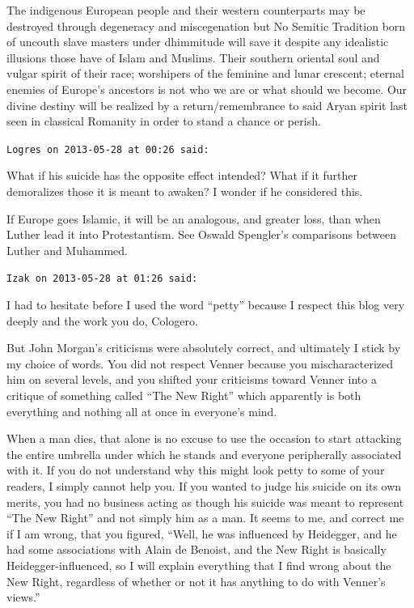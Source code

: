 \begin{footnotesize}
\begin{sffamily}
The indigenous European people and their western counterparts may be destroyed through degeneracy and miscegenation but No Semitic Tradition born of uncouth slave masters under dhimmitude will save it despite any idealistic illusions those have of Islam and Muslims. Their southern oriental soul and vulgar spirit of their race; worshipers of the feminine and lunar crescent; eternal enemies of Europe's ancestors is not who we are or what should we become. Our divine destiny will be realized by a return/remembrance to said Aryan spirit last seen in classical Romanity in order to stand a chance or perish.

\hfill

\texttt{Logres on 2013-05-28 at 00:26 said:}

What if his suicide has the opposite effect intended? What if it further demoralizes those it is meant to awaken? I wonder if he considered this.

If Europe goes Islamic, it will be an analogous, and greater loss, than when Luther lead it into Protestantism. See Oswald Spengler's comparisons between Luther and Muhammed.

\hfill

\texttt{Izak on 2013-05-28 at 01:26 said:}

I had to hesitate before I used the word ``petty'' because I respect this blog very deeply and the work you do, Cologero.

But John Morgan's criticisms were absolutely correct, and ultimately I stick by my choice of words. You did not respect Venner because you mischaracterized him on several levels, and you shifted your criticisms toward Venner into a critique of something called ``The New Right'' which apparently is both everything and nothing all at once in everyone's mind.

When a man dies, that alone is no excuse to use the occasion to start attacking the entire umbrella under which he stands and everyone peripherally associated with it. If you do not understand why this might look petty to some of your readers, I simply cannot help you. If you wanted to judge his suicide on its own merits, you had no business acting as though his suicide was meant to represent ``The New Right'' and not simply him as a man. It seems to me, and correct me if I am wrong, that you figured, ``Well, he was influenced by Heidegger, and he had some associations with Alain de Benoist, and the New Right is basically Heidegger-influenced, so I will explain everything that I find wrong about the New Right, regardless of whether or not it has anything to do with Venner's views.''


\end{sffamily}
\end{footnotesize}
